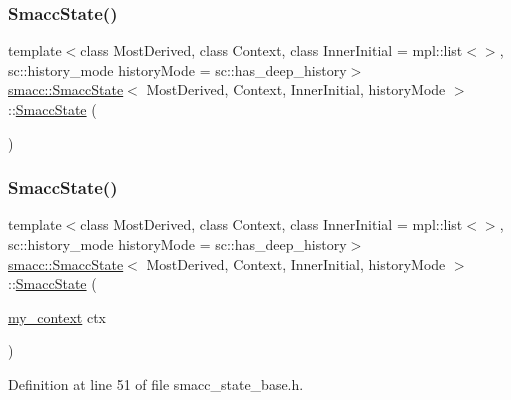 \subsubsection{\texorpdfstring{Smacc\+State()}{SmaccState()}\hspace{0.1cm}{\footnotesize\ttfamily [1/2]}}
{\footnotesize\ttfamily template$<$class Most\+Derived, class Context, class Inner\+Initial = mpl\+::list$<$$>$, sc\+::history\+\_\+mode history\+Mode = sc\+::has\+\_\+deep\+\_\+history$>$ \\
\hyperlink{classsmacc_1_1SmaccState}{smacc\+::\+Smacc\+State}$<$ Most\+Derived, Context, Inner\+Initial, history\+Mode $>$\+::\hyperlink{classsmacc_1_1SmaccState}{Smacc\+State} (\begin{DoxyParamCaption}{ }\end{DoxyParamCaption})\hspace{0.3cm}{\ttfamily [delete]}}

\mbox{\label{classsmacc_1_1SmaccState_adc225018fe91da47e6e9f1d20150b26a}} 
\subsubsection{\texorpdfstring{Smacc\+State()}{SmaccState()}\hspace{0.1cm}{\footnotesize\ttfamily [2/2]}}
{\footnotesize\ttfamily template$<$class Most\+Derived, class Context, class Inner\+Initial = mpl\+::list$<$$>$, sc\+::history\+\_\+mode history\+Mode = sc\+::has\+\_\+deep\+\_\+history$>$ \\
\hyperlink{classsmacc_1_1SmaccState}{smacc\+::\+Smacc\+State}$<$ Most\+Derived, Context, Inner\+Initial, history\+Mode $>$\+::\hyperlink{classsmacc_1_1SmaccState}{Smacc\+State} (\begin{DoxyParamCaption}\item[{\hyperlink{structsmacc_1_1SmaccState_1_1my__context}{my\+\_\+context}}]{ctx }\end{DoxyParamCaption})\hspace{0.3cm}{\ttfamily [inline]}}



Definition at line 51 of file smacc\+\_\+state\+\_\+base.\+h.


